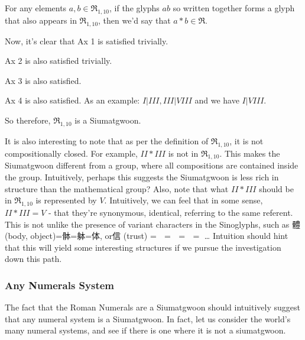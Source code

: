 For any elements $a,b\in \mathfrak{R}_{1,10}$, if the glyphs $ab$ so written together forms a glyph that also appears in $\mathfrak{R}_{1,10}$, then we'd say that $a*b\in \mathfrak{R}$.

Now, it's clear that Ax 1 is satisfied trivially. 

Ax 2 is also satisfied trivially.

Ax 3 is also satisfied. 

Ax 4 is also satisfied. As an example: $I | III, III | VIII$ and we have $I|VIII$.

So therefore, $\mathfrak{R}_{1,10}$ is a Siumatgwoon. 

It is also interesting to note that as per the definition of $\mathfrak{R}_{1,10}$, it is not compositionally closed. For example, $II * III$ is not in $\mathfrak{R}_{1,10}$. This makes the Siumatgwoon different from a group, where all compositions are contained inside the group. Intuitively, perhaps this suggests the Siumatgwoon is less rich in structure than the mathematical group? Also, note that what $II * III$ should be in $\mathfrak{R}_{1,10}$ is represented by $V$. Intuitively, we can feel that in some sense, $II * III = V$ - that they're synonymous, identical, referring to the same referent. This is not unlike the presence of variant characters in the Sinoglyphs, such as 體 (body, object)=骵=躰=体, or信 (trust) = 𬢭 = 伩 = 訫 = 㐰… Intuition should hint that this will yield some interesting structures if we pursue the investigation down this path.

\subsubsection{Any Numerals System}

The fact that the Roman Numerals are a Siumatgwoon should intuitively suggest that any numeral system is a Siumatgwoon. In fact, let us consider the world's many numeral systems, and see if there is one where it is not a siumatgwoon. 

